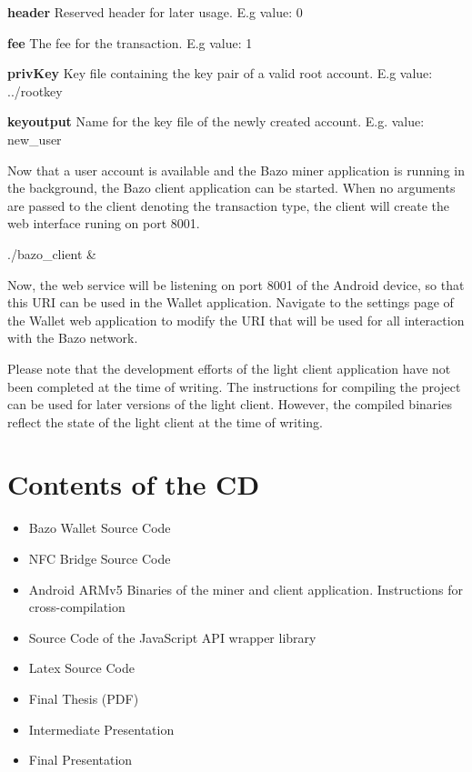 \textbf{header}  Reserved header for later usage. E.g value: 0

\textbf{fee}  The fee for the transaction. E.g value: 1

\textbf{privKey} Key file containing the key pair of a valid root account. E.g value: ../rootkey

\textbf{keyoutput} Name for the key file of the newly created account. E.g. value: new\_user

Now that a user account is available and the Bazo miner application is running in the background, the Bazo client application can be started. When no arguments are passed to the client denoting the transaction type, the client will create the web interface runing on port 8001.
\begin{framed}
./bazo\_client \&
\end{framed}
Now, the web service will be listening on port 8001 of the Android device, so that this URI can be used in the Wallet application. Navigate to the settings page of the Wallet web application to modify the URI that will be used for all  interaction with the Bazo network.

Please note that the development efforts of the light client application have not been completed at the time of writing. The instructions for compiling the project can be used for later versions of the light client. However, the compiled binaries reflect the state of the light client at the time of writing.

\chapter{Contents of the CD}
\begin{itemize}
\item Bazo Wallet Source Code
\item NFC Bridge Source Code
\item Android ARMv5 Binaries of the miner and client application. Instructions for cross-compilation
\item Source Code of the JavaScript API wrapper library
\item Latex Source Code
\item Final Thesis (PDF)
\item Intermediate Presentation
\item Final Presentation

\end{itemize}
